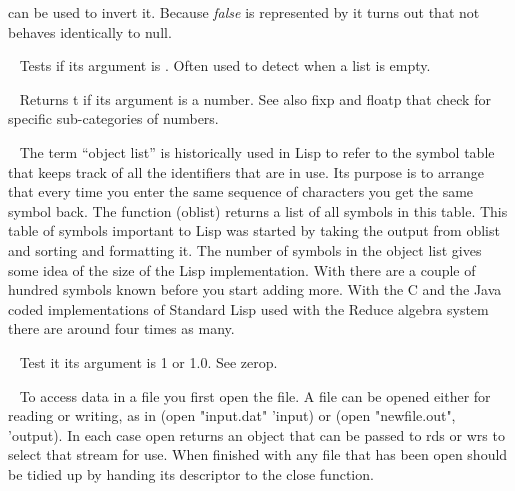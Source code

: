 \begin{description}
can be used to invert it. Because {\em false} is represented by \nil{} it
turns out that {\tx not} behaves identically to {\tx null}.
\item[{\tx null~~~~~~~~~} \hspace{1cm} {\em function 1 arg}]~\newline
Tests if its argument is \nil. Often used to detect when a list is empty.
\item[{\tx numberp~~~~~~} \hspace{1cm} {\em function 1 arg}]~\newline
Returns {\tx t} if its argument is a number. See also {\tx fixp} and
{\tx floatp} that check for specific sub-categories of numbers.
\item[{\tx oblist~~~~~~~} \hspace{1cm} {\em function 0 args}]~\newline
The term ``object list'' is historically used in Lisp to refer to the
symbol table that keeps track of all the identifiers that are in use. Its
purpose is to arrange that every time you enter the same sequence of characters
you get the same symbol back. The function {\tx (oblist)} returns a list of
all symbols in this table. This table of symbols important to Lisp was
started by taking the output from {\tx oblist} and sorting and
formatting it. The number of symbols in the object list gives some idea
of the size of the Lisp implementation. With \vsl{} there are a couple of hundred
symbols known before you start adding more. With the C and the Java coded
implementations of Standard Lisp used with the Reduce algebra system there are
around four times as many.
\item[{\tx onep~~~~~~~~~} \hspace{1cm} {\em function 1 arg}]~\newline
Test it its argument is 1 or 1.0. See {\tx zerop}.
\item[{\tx open~~~~~~~~~} \hspace{1cm} {\em function 2 args}]~\newline
To access data in a file you first {\tx open} the file. A file can be
opened either for reading or writing, as in {\tx (open "input.dat" 'input)}
or {\tx (open "newfile.out", 'output)}. In each case {\tx open} returns
an object that can be passed to {\tx rds} or {\tx wrs} to select that stream
for use. When finished with any file that has been open should be
tidied up by handing its descriptor to the {\tx close} function.

\end{description}
